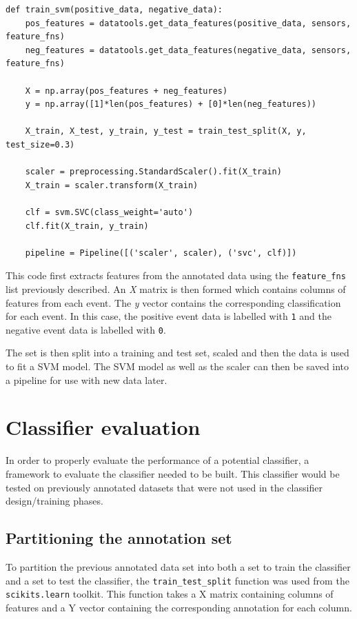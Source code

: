 \begin{verbatim}
def train_svm(positive_data, negative_data):
    pos_features = datatools.get_data_features(positive_data, sensors, feature_fns)
    neg_features = datatools.get_data_features(negative_data, sensors, feature_fns)
    
    X = np.array(pos_features + neg_features)
    y = np.array([1]*len(pos_features) + [0]*len(neg_features))
    
    X_train, X_test, y_train, y_test = train_test_split(X, y, test_size=0.3)
    
    scaler = preprocessing.StandardScaler().fit(X_train)
    X_train = scaler.transform(X_train)
    
    clf = svm.SVC(class_weight='auto')
    clf.fit(X_train, y_train) 
    
    pipeline = Pipeline([('scaler', scaler), ('svc', clf)])
\end{verbatim}


This code first extracts features from the annotated data using the \texttt{feature\_fns} list previously described. An \textit{X} matrix is then formed which contains columns of features from each event. The \textit{y} vector contains the corresponding classification for each event. In this case, the positive event data is labelled with \texttt{1} and the negative event data is labelled with \texttt{0}.

The set is then split into a training and test set, scaled and then the data is used to fit a SVM model. The SVM model as well as the scaler can then be saved into a pipeline for use with new data later.  

\section{Classifier evaluation}
In order to properly evaluate the performance of a potential classifier, a framework to evaluate the classifier needed to be built. This classifier would be tested on previously annotated datasets that were not used in the classifier design/training phases. 

\subsection{Partitioning the annotation set}
To partition the previous annotated data set into both a set to train the classifier and a set to test the classifier, the \texttt{train\_test\_split} function was used from the \texttt{scikits.learn} toolkit. This function takes a X matrix containing columns of features and a Y vector containing the corresponding annotation for each column. 

